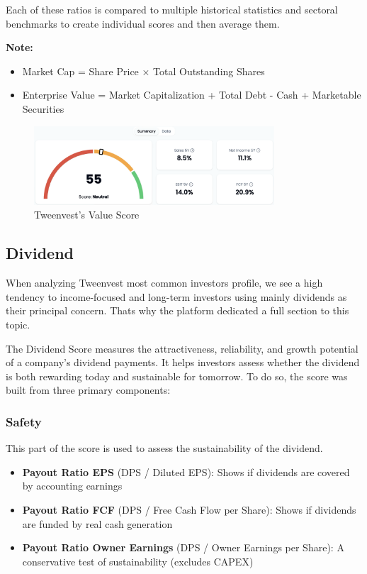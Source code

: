 \documentclass[11pt,english,a4paper,hidelinks]{book}
\begin{document}
\vspace{0.5cm}
\noindent Each of these ratios is compared to multiple historical statistics and sectoral benchmarks to create individual scores and then average them.

\vspace{0.5cm}
\noindent \textbf{Note:}
\begin{itemize}
    \item Market Cap = Share Price × Total Outstanding Shares
    \item Enterprise Value = Market Capitalization + Total Debt - Cash + Marketable Securities
\end{itemize}

\begin{figure}[H]
    \centering
    \includegraphics[width=0.8\textwidth]{images/tweenvest/value score.png}
    \caption{Tweenvest's Value Score}
    \label{fig:valuation_score}
\end{figure}


\subsection{Dividend}
\noindent When analyzing Tweenvest most common investors profile, we see a high tendency to income-focused and long-term investors using mainly dividends as their principal concern. Thats why the platform dedicated a full section to this topic. 

\vspace{0.5cm}
\noindent The Dividend Score measures the attractiveness, reliability, and growth potential of a company's dividend payments. It helps investors assess whether the dividend is both rewarding today and sustainable for tomorrow. To do so, the score was built from three primary components:

\subsubsection{Safety}
This part of the score is used to assess the sustainability of the dividend.
\begin{itemize}
    \item \textbf{Payout Ratio EPS} (DPS / Diluted EPS): Shows if dividends are covered by accounting earnings
    \item \textbf{Payout Ratio FCF} (DPS / Free Cash Flow per Share): Shows if dividends are funded by real cash generation
    \item \textbf{Payout Ratio Owner Earnings} (DPS / Owner Earnings per Share): A conservative test of sustainability (excludes CAPEX)
\end{itemize}
\end{document}
